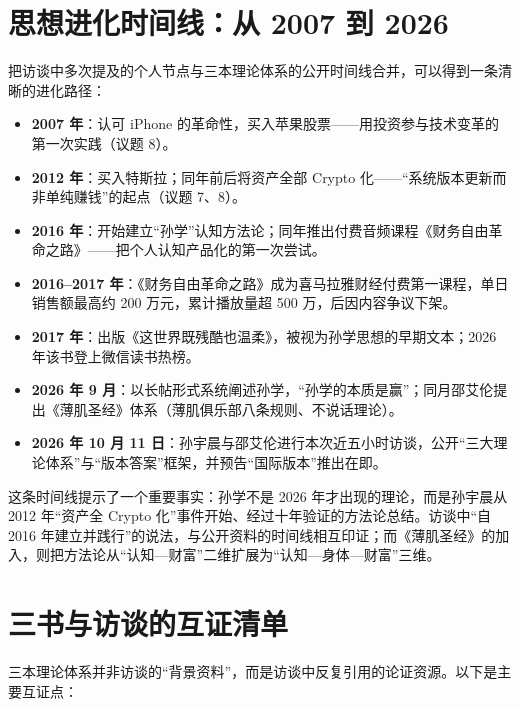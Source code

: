 \section{思想进化时间线：从 2007 到
2026}

把访谈中多次提及的个人节点与三本理论体系的公开时间线合并，可以得到一条清晰的进化路径：

\begin{itemize}
\tightlist
\item
  \textbf{2007 年}：认可 iPhone
  的革命性，买入苹果股票------用投资参与技术变革的第一次实践（议题 8）。
\item
  \textbf{2012 年}：买入特斯拉；同年前后将资产全部 Crypto
  化------``系统版本更新而非单纯赚钱''的起点（议题 7、8）。
\item
  \textbf{2016
  年}：开始建立``孙学''认知方法论；同年推出付费音频课程《财务自由革命之路》------把个人认知产品化的第一次尝试。
\item
  \textbf{2016--2017
  年}：《财务自由革命之路》成为喜马拉雅财经付费第一课程，单日销售额最高约
  200 万元，累计播放量超 500 万，后因内容争议下架。
\item
  \textbf{2017
  年}：出版《这世界既残酷也温柔》，被视为孙学思想的早期文本；2026
  年该书登上微信读书热榜。
\item
  \textbf{2026 年 9
  月}：以长帖形式系统阐述孙学，``孙学的本质是赢''；同月邵艾伦提出《薄肌圣经》体系（薄肌俱乐部八条规则、不说话理论）。
\item
  \textbf{2026 年 10 月 11
  日}：孙宇晨与邵艾伦进行本次近五小时访谈，公开``三大理论体系''与``版本答案''框架，并预告``国际版本''推出在即。
\end{itemize}

这条时间线提示了一个重要事实：孙学不是 2026 年才出现的理论，而是孙宇晨从
2012 年``资产全 Crypto
化''事件开始、经过十年验证的方法论总结。访谈中``自 2016
年建立并践行''的说法，与公开资料的时间线相互印证；而《薄肌圣经》的加入，则把方法论从``认知---财富''二维扩展为``认知---身体---财富''三维。

\section{三书与访谈的互证清单}

三本理论体系并非访谈的``背景资料''，而是访谈中反复引用的论证资源。以下是主要互证点：

